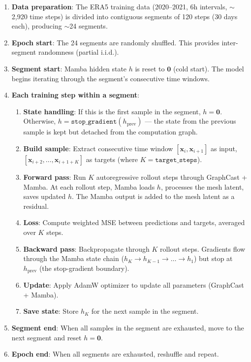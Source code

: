 \documentclass[11pt,a4paper]{article}
\begin{document}
\begin{enumerate}
  \item \textbf{Data preparation}: The ERA5 training data (2020--2021, 6h intervals, $\sim$2,920 time steps) is divided into contiguous segments of 120 steps (30 days each), producing $\sim$24 segments.

  \item \textbf{Epoch start}: The 24 segments are randomly shuffled. This provides inter-segment randomness (partial i.i.d.).

  \item \textbf{Segment start}: Mamba hidden state $h$ is reset to $\mathbf{0}$ (cold start). The model begins iterating through the segment's consecutive time windows.

  \item \textbf{Each training step within a segment}:
  \begin{enumerate}[nosep]
    \item \textbf{State handling}: If this is the first sample in the segment, $h = \mathbf{0}$. Otherwise, $h = \texttt{stop\_gradient}(h_\text{prev})$ — the state from the previous sample is kept but detached from the computation graph.
    \item \textbf{Build sample}: Extract consecutive time window $[\mathbf{x}_i, \mathbf{x}_{i+1}]$ as input, $[\mathbf{x}_{i+2}, \ldots, \mathbf{x}_{i+1+K}]$ as targets (where $K = \texttt{target\_steps}$).
    \item \textbf{Forward pass}: Run $K$ autoregressive rollout steps through GraphCast + Mamba. At each rollout step, Mamba loads $h$, processes the mesh latent, saves updated $h$. The Mamba output is added to the mesh latent as a residual.
    \item \textbf{Loss}: Compute weighted MSE between predictions and targets, averaged over $K$ steps.
    \item \textbf{Backward pass}: Backpropagate through $K$ rollout steps. Gradients flow through the Mamba state chain ($h_K \to h_{K-1} \to \ldots \to h_1$) but stop at $h_\text{prev}$ (the stop-gradient boundary).
    \item \textbf{Update}: Apply AdamW optimizer to update all parameters (GraphCast + Mamba).
    \item \textbf{Save state}: Store $h_K$ for the next sample in the segment.
  \end{enumerate}

  \item \textbf{Segment end}: When all samples in the segment are exhausted, move to the next segment and reset $h = \mathbf{0}$.

  \item \textbf{Epoch end}: When all segments are exhausted, reshuffle and repeat.
\end{enumerate}
\end{document}
